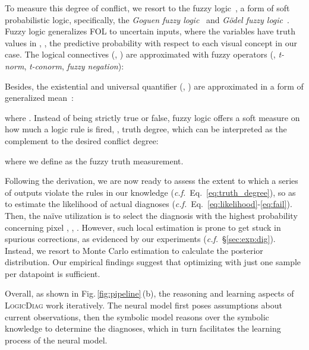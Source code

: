 \documentclass[10pt,twocolumn,letterpaper]{article}
\def\Ours{{\textsc{LogicDiag}}}
\begin{document}
To measure this degree of conflict, we resort to the fuzzy logic~\cite{kosko1993fuzzy}, a form of soft probabilistic logic, specifically, the \textit{Goguen fuzzy logic}~\cite{hajek2013metamathematics} and \textit{G\"odel fuzzy logic}~\cite{godel1986kurt}.
Fuzzy logic generalizes FOL to uncertain inputs, where the variables have truth values in , \eg, the predictive probability with respect to each visual concept in our case.
The logical connectives (\eg, ) are approximated with fuzzy operators (\ie,  \textit{t-norm}, \textit{t-conorm}, \textit{fuzzy negation}):
\vspace{-3pt}

Besides, the existential and universal quantifier (\ie, ) are approximated in a form of generalized mean~\cite{van2022analyzing,badreddine2022logic}:
\vspace{-3pt}

where . Instead of being strictly true or false, fuzzy logic offers a soft measure on how much a logic rule is fired, \ie, truth degree, which can be interpreted as the complement to the desired conflict degree:
\vspace{-3pt}

where we define  as the fuzzy truth measurement.

Following the derivation, we are now ready to assess the extent to which a series of outputs violate the rules in our knowledge  (\textit{c.f.\!}~Eq.~\ref{eq:truth_degree}), so as to estimate the likelihood of actual diagnoses (\textit{c.f.\!}~Eq.~\ref{eq:likelihood}-\ref{eq:fail}).
Then, the na\"ive utilization is to select the diagnosis with the highest probability concerning pixel , \ie, . However, such local estimation is prone to get stuck in spurious corrections, as evidenced by our experiments (\textit{c.f.\!}~\S\ref{sec:exp:dig}).
Instead, we resort to Monte Carlo estimation to calculate the posterior distribution. Our empirical findings suggest that optimizing with just one sample per datapoint is sufficient.

Overall, as shown in Fig.\,\ref{fig:pipeline}\,(b), the reasoning and learning aspects of {\Ours} work iteratively. The neural model  first poses assumptions about current observations, then the symbolic model  reasons over the symbolic knowledge  to determine the diagnoses, which in turn facilitates the learning process of the neural model.
\end{document}
